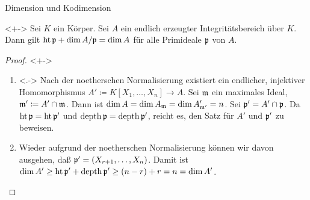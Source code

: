 \begin{frame}{Dimension und Kodimension}
	\begin{theorem}<+->
		Sei \(K\) ein Körper. Sei \(A\) ein endlich erzeugter Integritätsbereich
		über \(K\). Dann gilt \(\operatorname{ht} \mathfrak{p} + \dim A/\mathfrak{p} = \dim A\)
		für alle Primideale \(\mathfrak{p}\) von \(A\).
	\end{theorem}
	\begin{proof}<+->
		\begin{enumerate}[<+->]
		\item<.->
			Nach der noetherschen Normalisierung existiert ein endlicher,
			injektiver Homomorphismus \(A' \coloneqq K[X_1, \dotsc, X_n] \to A\).
			Sei \(\mathfrak{m}\) ein maximales Ideal, \(\mathfrak{m}' \coloneqq A' \cap \mathfrak{m}\). Dann ist \(\dim A = \dim A_{\mathfrak{m}} =
			\dim A'_{\mathfrak{m}'} = n\). Sei \(\mathfrak{p}' = A' \cap \mathfrak{p}\). Da \(\operatorname{ht} \mathfrak{p} = \operatorname{ht} \mathfrak{p}'\)
			und \(\operatorname{depth} \mathfrak{p} = \operatorname{depth} \mathfrak{p}'\), reicht es, den Satz für \(A'\) und \(\mathfrak{p}'\) zu beweisen.
		\item
			Wieder aufgrund der noetherschen Normalisierung können wir davon ausgehen, daß \(\mathfrak{p}' = (X_{r + 1},
			\dotsc, X_n)\). Damit ist
			\(\dim A' \ge \operatorname{ht} \mathfrak{p}' + \operatorname{depth} \mathfrak{p}' \ge (n - r) + r = n = \dim A'\).
			\qedhere
		\end{enumerate}
	\end{proof}
\end{frame}

